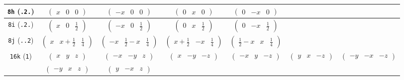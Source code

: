 \documentclass[fleqn,9pt,landscape]{jsarticle}
\begin{document}
\begin{center}
\begin{longtable}{ccccccc}
{\tt 8h} ({\tt .2.}) & $ \begin{pmatrix} x & 0 & 0 \end{pmatrix} $ & $ \begin{pmatrix} - x & 0 & 0 \end{pmatrix} $ & $ \begin{pmatrix} 0 & x & 0 \end{pmatrix} $ & $ \begin{pmatrix} 0 & - x & 0 \end{pmatrix} $ & $  $ & $  $ \\ \hline
{\tt 8i} ({\tt .2.}) & $ \begin{pmatrix} x & 0 & \frac{1}{2} \end{pmatrix} $ & $ \begin{pmatrix} - x & 0 & \frac{1}{2} \end{pmatrix} $ & $ \begin{pmatrix} 0 & x & \frac{1}{2} \end{pmatrix} $ & $ \begin{pmatrix} 0 & - x & \frac{1}{2} \end{pmatrix} $ & $  $ & $  $ \\ \hline
{\tt 8j} ({\tt ..2}) & $ \begin{pmatrix} x & x + \frac{1}{2} & \frac{1}{4} \end{pmatrix} $ & $ \begin{pmatrix} - x & \frac{1}{2} - x & \frac{1}{4} \end{pmatrix} $ & $ \begin{pmatrix} x + \frac{1}{2} & - x & \frac{1}{4} \end{pmatrix} $ & $ \begin{pmatrix} \frac{1}{2} - x & x & \frac{1}{4} \end{pmatrix} $ & $  $ & $  $ \\ \hline
{\tt 16k} ({\tt 1}) & $ \begin{pmatrix} x & y & z \end{pmatrix} $ & $ \begin{pmatrix} - x & - y & z \end{pmatrix} $ & $ \begin{pmatrix} x & - y & - z \end{pmatrix} $ & $ \begin{pmatrix} - x & y & - z \end{pmatrix} $ & $ \begin{pmatrix} y & x & - z \end{pmatrix} $ & $ \begin{pmatrix} - y & - x & - z \end{pmatrix} $ \\
& $ \begin{pmatrix} - y & x & z \end{pmatrix} $ & $ \begin{pmatrix} y & - x & z \end{pmatrix} $ & $  $ & $  $ & $  $ & $  $ \\
\end{longtable}
\end{center}
\end{document}
